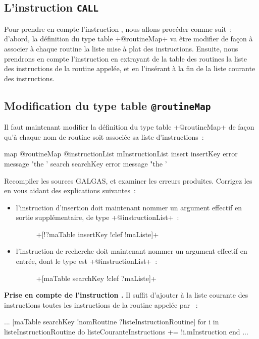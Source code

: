 \subsection{L'instruction \texttt{CALL}}
Pour prendre en compte l’instruction , nous allons procéder comme suit~: d’abord, la définition du type table \ggs+@routineMap+ va être modifier de façon à associer à chaque routine la liste mise à plat des instructions. Ensuite, nous prendrons en compte l’instruction  en extrayant de la table des routines la liste des instructions de la routine appelée, et en l’insérant à la fin de la liste courante des instructions.

\subsection{Modification du type table \texttt{@routineMap}}
Il faut maintenant modifier la définition du type table \ggs+@routineMap+ de façon qu'à chaque nom de routine soit associée sa liste d'instructions~:

\begin{galgas}
map @routineMap {
  @instructionList mInstructionList
  insert insertKey  error message "the '%
  search searchKey error message "the '%
}
\end{galgas}

Recompiler les sources GALGAS, et examiner les erreurs produites. Corrigez les en vous aidant des explications suivantes~:
\begin{itemize}
  \item l'instruction d'insertion doit maintenant nommer un argument effectif en sortie supplémentaire, de type \ggs+@instructionList+~:
  \begin{description}
    \item[ ] \ggs+[!?maTable insertKey !clef !maListe]+
  \end{description}
  \item l'instruction de recherche doit maintenant nommer un argument effectif en entrée, dont le type est \ggs+@instructionList+~:
  \begin{description}
    \item[ ] \ggs+[maTable searchKey !clef ?maListe]+
  \end{description}
\end{itemize}

{\bf Prise en compte de l'instruction .} Il suffit d'ajouter à la liste courante des instructions toutes les instructions de la routine appelée par ~:
\begin{galgas}
...
[maTable searchKey !nomRoutine ?listeInstructionRoutine]
for i in listeInstructionRoutine do
  listeCouranteInstructions += !i.mInstruction
end
...
\end{galgas}

